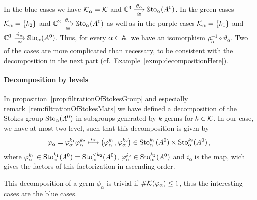 In the \textcolor{blue!75!black}{blue} cases we have $\mathcal{K}_\alpha=\mathcal{K}$ and
$\mathbb{C}^3\overset{\vartheta_\alpha}{\underset{\cong}{\longrightarrow}}\operatorname{\mathbb{S}to}_\alpha(A^0)$.
In the \textcolor{green!50!black}{green} cases $\mathcal{K}_\alpha=\{k_2\}$ and
$\mathbb{C}^2\overset{\vartheta_\alpha}{\underset{\cong}{\longrightarrow}}\operatorname{\mathbb{S}to}_\alpha(A^0)$
as well as in the \textcolor{purple!75!black}{purple} cases
$\mathcal{K}_\alpha=\{k_1\}$ and
$\mathbb{C}^1\overset{\vartheta_\alpha}{\underset{\cong}{\longrightarrow}}\operatorname{\mathbb{S}to}_\alpha(A^0)$.
Thus, for every $\alpha\in\mathbb{A}$, we have an isomorphism
$\rho_{\tilde\alpha}^{-1}\circ\vartheta_\alpha$.
Two of the cases are more complicated than necessary, to be consistent with
the decomposition in the next part (cf.\ Example~\ref{exmp:decompositionHere}).

\paragraph{Decomposition by levels}
In proposition~\ref{prop:filtrationOfStokesGroup} and especially
remark~\ref{rem:filtrationOfStokesMats} we have defined a decomposition of the
Stokes group $\operatorname{Sto}_\alpha(A^0)$ in subgroups generated by $k$-germs for
$k\in\mathcal{K}$.
In our case, we have at most two level, such that this decomposition is given
by
\[
  \varphi_\alpha=\varphi_\alpha^{k_1} \varphi_\alpha^{k_2}
  \overset{i_\alpha}\longmapsto
    \left(\varphi_\alpha^{k_1},\varphi_\alpha^{k_2}\right)
      \in\operatorname{Sto}_\alpha^{k_1}(A^0)\times\operatorname{Sto}_\alpha^{k_2}(A^0) \,,
\]
where $\varphi_\alpha^{k_1}\in\operatorname{Sto}_\alpha^{k_1}(A^0)=\operatorname{Sto}_\alpha^{<k_2}(A^0)$,
$\varphi_\alpha^{k_2}\in\operatorname{Sto}_\alpha^{k_2}(A^0)$  and $i_\alpha$ is the map, wich
gives the factors of this factorization in ascending order.

This decomposition of a germ $\phi_\alpha$ is trivial if
$\#\mathcal{K}(\varphi_\alpha)\leq1$, thus the interesting cases are the
\textcolor{blue!75!black}{blue} cases.


